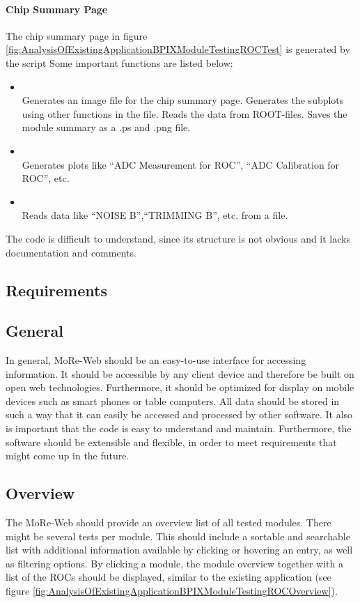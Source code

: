 \documentclass[0_Bericht]{subfiles}
\begin{document}
				\paragraph{Chip Summary Page}
					The chip summary page in figure \ref{fig:AnalysisOfExistingApplicationBPIXModuleTestingROCTest} is generated by the script 
					Some important functions are listed below:
					\begin{itemize}
						\item {} \\
							Generates an image file for the chip summary page. 
							Generates the subplots using other functions in the file. Reads the data from ROOT-files. Saves the module summary as a .ps and .png file. 
						\item {} \\
							Generates plots like ``ADC Measurement for ROC'', ``ADC Calibration for ROC'', etc.
						\item {} \\
							Reads data like ``NOISE B'',``TRIMMING B'', etc. from a file.
					\end{itemize}
					The code is difficult to understand, since its structure is not obvious and it lacks documentation and comments.
		\subsection{Requirements}
			\subsection{General}
				 In general, MoRe-Web should be an easy-to-use interface for accessing information. It should be accessible by any client device and therefore be built on open web technologies. Furthermore, it should be optimized for display on mobile devices such as smart phones or table computers. All data should be stored in such a way that it can easily be accessed and processed by other software. 
				 It also is important that the code is easy to understand and maintain.
				 Furthermore, the software should be extensible and flexible, in order to meet requirements that might come up in the future.
			\subsection{Overview}
				The MoRe-Web should provide an overview list of all tested modules. There might be several tests per module. This should include a sortable and searchable list with additional information available by clicking or hovering an entry, as well as filtering options.
				By clicking a module, the module overview together with a list of the ROCs should be displayed, similar to the existing application (see figure \ref{fig:AnalysisOfExistingApplicationBPIXModuleTestingROCOverview}).
\end{document}

